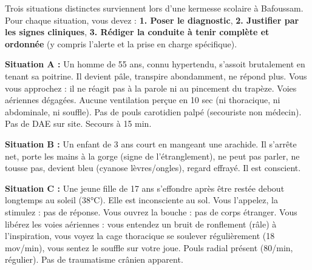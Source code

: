 \documentclass[11pt]{article}
\begin{document}
\begin{exercice}
Trois situations distinctes surviennent lors d'une kermesse scolaire à Bafoussam. Pour chaque situation, vous devez : \textbf{1. Poser le diagnostic}, \textbf{2. Justifier par les signes cliniques}, \textbf{3. Rédiger la conduite à tenir complète et ordonnée} (y compris l'alerte et la prise en charge spécifique).

\textbf{Situation A :} Un homme de 55 ans, connu hypertendu, s'assoit brutalement en tenant sa poitrine. Il devient pâle, transpire abondamment, ne répond plus. Vous vous approchez : il ne réagit pas à la parole ni au pincement du trapèze. Voies aériennes dégagées. Aucune ventilation perçue en 10 sec (ni thoracique, ni abdominale, ni souffle). Pas de pouls carotidien palpé (secouriste non médecin). Pas de DAE sur site. Secours à 15 min.

\textbf{Situation B :} Un enfant de 3 ans court en mangeant une arachide. Il s'arrête net, porte les mains à la gorge (signe de l'étranglement), ne peut pas parler, ne tousse pas, devient bleu (cyanose lèvres/ongles), regard effrayé. Il est conscient.

\textbf{Situation C :} Une jeune fille de 17 ans s'effondre après être restée debout longtemps au soleil (38°C). Elle est inconsciente au sol. Vous l'appelez, la stimulez : pas de réponse. Vous ouvrez la bouche : pas de corps étranger. Vous libérez les voies aériennes : vous entendez un bruit de ronflement (râle) à l'inspiration, vous voyez la cage thoracique se soulever régulièrement (18 mov/min), vous sentez le souffle sur votre joue. Pouls radial présent (80/min, régulier). Pas de traumatisme crânien apparent.


\end{exercice}
\end{document}
